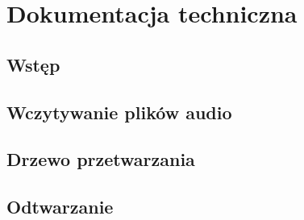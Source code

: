 \chapter{Dokumentacja techniczna}

\section{Wstęp}

\section{Wczytywanie plików audio}



\section{Drzewo przetwarzania}

\section{Odtwarzanie}


